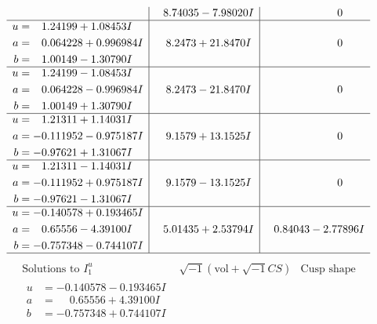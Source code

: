 \documentclass[1p]{elsarticle_modified}
\theoremstyle{definition}
\newcommand{\I}{\sqrt{-1}}
\begin{document}
$$\begin{array}{c|c|c}
 & \phantom{-}8.74035 - 7.98020 I & \phantom{-0.000000 } 0 \\ \hline\begin{aligned}
u &= \phantom{-}1.24199 + 1.08453 I \\
a &= \phantom{-}0.064228 + 0.996984 I \\
b &= \phantom{-}1.00149 - 1.30790 I\end{aligned}
 & \phantom{-}8.2473 + 21.8470 I & \phantom{-0.000000 } 0 \\ \hline\begin{aligned}
u &= \phantom{-}1.24199 - 1.08453 I \\
a &= \phantom{-}0.064228 - 0.996984 I \\
b &= \phantom{-}1.00149 + 1.30790 I\end{aligned}
 & \phantom{-}8.2473 - 21.8470 I & \phantom{-0.000000 } 0 \\ \hline\begin{aligned}
u &= \phantom{-}1.21311 + 1.14031 I \\
a &= -0.111952 - 0.975187 I \\
b &= -0.97621 + 1.31067 I\end{aligned}
 & \phantom{-}9.1579 + 13.1525 I & \phantom{-0.000000 } 0 \\ \hline\begin{aligned}
u &= \phantom{-}1.21311 - 1.14031 I \\
a &= -0.111952 + 0.975187 I \\
b &= -0.97621 - 1.31067 I\end{aligned}
 & \phantom{-}9.1579 - 13.1525 I & \phantom{-0.000000 } 0 \\ \hline\begin{aligned}
u &= -0.140578 + 0.193465 I \\
a &= \phantom{-}0.65556 - 4.39100 I \\
b &= -0.757348 - 0.744107 I\end{aligned}
 & \phantom{-}5.01435 + 2.53794 I & \phantom{-}0.84043 - 2.77896 I\\
 \hline 
 \end{array}$$\newpage$$\begin{array}{c|c|c}  
\text{Solutions to }I^u_{1}& \I (\text{vol} + \sqrt{-1}CS) & \text{Cusp shape}\\
 \hline 
\begin{aligned}
u &= -0.140578 - 0.193465 I \\
a &= \phantom{-}0.65556 + 4.39100 I \\
b &= -0.757348 + 0.744107 I\end{aligned}

\end{array}$$
\end{document}
